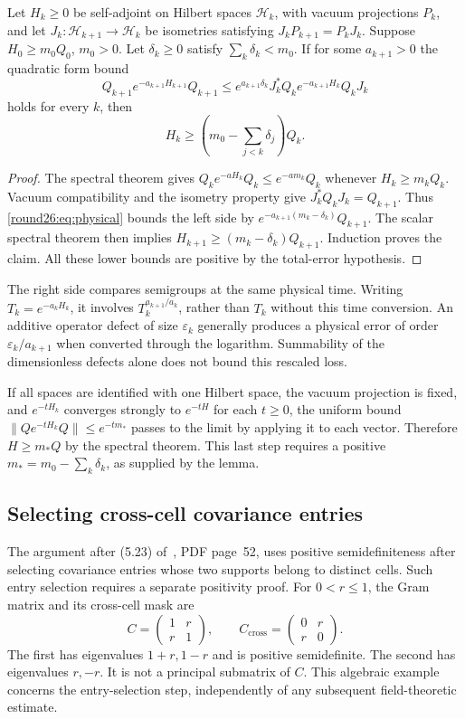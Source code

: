 \begin{lemma}\label{round26:lem:physical}
Let $H_k\ge0$ be self-adjoint on Hilbert spaces $\mathcal H_k$,
with vacuum projections $P_k$, and let $J_k:\mathcal H_{k+1}\to
\mathcal H_k$ be isometries satisfying $J_kP_{k+1}=P_kJ_k$.
Suppose $H_0\ge m_0Q_0$, $m_0>0$. Let $\delta_k\ge0$ satisfy
$\sum_k\delta_k<m_0$. If for some $a_{k+1}>0$ the quadratic
form bound
\begin{equation}\label{round26:eq:physical}
 Q_{k+1}e^{-a_{k+1}H_{k+1}}Q_{k+1}
 \le e^{a_{k+1}\delta_k}
       J_k^*Q_ke^{-a_{k+1}H_k}Q_kJ_k
\end{equation}
holds for every $k$, then
\[
 H_k\ge\left(m_0-\sum_{j<k}\delta_j\right)Q_k.
\]
\end{lemma}
\begin{proof}
The spectral theorem gives
$Q_ke^{-aH_k}Q_k\le e^{-am_k}Q_k$ whenever
$H_k\ge m_kQ_k$. Vacuum compatibility and the isometry
property give $J_k^*Q_kJ_k=Q_{k+1}$. Thus
\eqref{round26:eq:physical} bounds the left side by
$e^{-a_{k+1}(m_k-\delta_k)}Q_{k+1}$.
The scalar spectral theorem then implies
$H_{k+1}\ge(m_k-\delta_k)Q_{k+1}$. Induction proves the
claim. All these lower bounds are positive by the total-error
hypothesis.
\end{proof}

The right side compares semigroups at the same physical time.
Writing $T_k=e^{-a_kH_k}$, it involves
$T_k^{a_{k+1}/a_k}$, rather than $T_k$ without this time
conversion. An additive operator defect of size $\varepsilon_k$
generally produces a physical error of order
$\varepsilon_k/a_{k+1}$ when converted through the logarithm.
Summability of the dimensionless defects alone does not bound
this rescaled loss.

If all spaces are identified with one Hilbert space, the
vacuum projection is fixed, and $e^{-tH_k}$ converges strongly
to $e^{-tH}$ for each $t\ge0$, the uniform bound
$\|Qe^{-tH_k}Q\|\le e^{-tm_*}$ passes to the limit by
applying it to each vector. Therefore $H\ge m_*Q$ by the
spectral theorem. This last step requires a positive
$m_*=m_0-\sum_k\delta_k$, as supplied by the lemma.

\subsection{Selecting cross-cell covariance entries}
The argument after (5.23) of~\cite{FaS26}, PDF page~52,
uses positive semidefiniteness after selecting covariance
entries whose two supports belong to distinct cells. Such
entry selection requires a separate positivity proof.
For $0<r\le1$, the Gram matrix and its cross-cell mask are
\[
 C=\begin{pmatrix}1&r\\r&1\end{pmatrix},\qquad
 C_{\mathrm{cross}}=\begin{pmatrix}0&r\\r&0\end{pmatrix}.
\]
The first has eigenvalues $1+r,1-r$ and is positive
semidefinite. The second has eigenvalues $r,-r$.
It is not a principal submatrix of $C$. This algebraic
example concerns the entry-selection step, independently
of any subsequent field-theoretic estimate.

